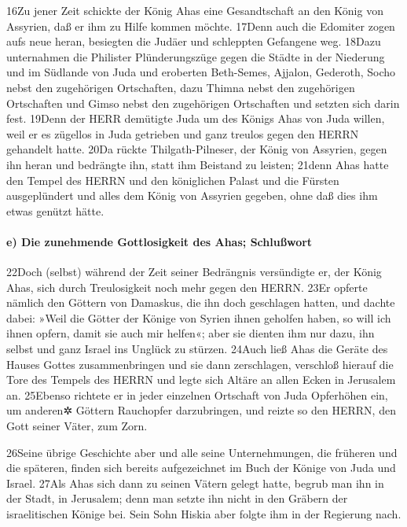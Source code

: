 16Zu jener Zeit schickte der König Ahas eine Gesandtschaft an den König
von Assyrien, daß er ihm zu Hilfe kommen möchte. 17Denn auch die
Edomiter zogen aufs neue heran, besiegten die Judäer und schleppten
Gefangene weg. 18Dazu unternahmen die Philister Plünderungszüge gegen
die Städte in der Niederung und im Südlande von Juda und eroberten
Beth-Semes, Ajjalon, Gederoth, Socho nebst den zugehörigen Ortschaften,
dazu Thimna nebst den zugehörigen Ortschaften und Gimso nebst den
zugehörigen Ortschaften und setzten sich darin fest. 19Denn der HERR
demütigte Juda um des Königs Ahas von Juda willen, weil er es zügellos
in Juda getrieben und ganz treulos gegen den HERRN gehandelt hatte. 20Da
rückte Thilgath-Pilneser, der König von Assyrien, gegen ihn heran und
bedrängte ihn, statt ihm Beistand zu leisten; 21denn Ahas hatte den
Tempel des HERRN und den königlichen Palast und die Fürsten
ausgeplündert und alles dem König von Assyrien gegeben, ohne daß dies
ihm etwas genützt hätte.

\hypertarget{e-die-zunehmende-gottlosigkeit-des-ahas-schluuxdfwort}{%
\paragraph{e) Die zunehmende Gottlosigkeit des Ahas;
Schlußwort}\label{e-die-zunehmende-gottlosigkeit-des-ahas-schluuxdfwort}}

22Doch (selbst) während der Zeit seiner Bedrängnis versündigte er, der
König Ahas, sich durch Treulosigkeit noch mehr gegen den HERRN. 23Er
opferte nämlich den Göttern von Damaskus, die ihn doch geschlagen
hatten, und dachte dabei: »Weil die Götter der Könige von Syrien ihnen
geholfen haben, so will ich ihnen opfern, damit sie auch mir helfen«;
aber sie dienten ihm nur dazu, ihn selbst und ganz Israel ins Unglück zu
stürzen. 24Auch ließ Ahas die Geräte des Hauses Gottes zusammenbringen
und sie dann zerschlagen, verschloß hierauf die Tore des Tempels des
HERRN und legte sich Altäre an allen Ecken in Jerusalem an. 25Ebenso
richtete er in jeder einzelnen Ortschaft von Juda Opferhöhen ein, um
anderen✲ Göttern Rauchopfer darzubringen, und reizte so den HERRN, den
Gott seiner Väter, zum Zorn.

26Seine übrige Geschichte aber und alle seine Unternehmungen, die
früheren und die späteren, finden sich bereits aufgezeichnet im Buch der
Könige von Juda und Israel. 27Als Ahas sich dann zu seinen Vätern gelegt
hatte, begrub man ihn in der Stadt, in Jerusalem; denn man setzte ihn
nicht in den Gräbern der israelitischen Könige bei. Sein Sohn Hiskia
aber folgte ihm in der Regierung nach.

